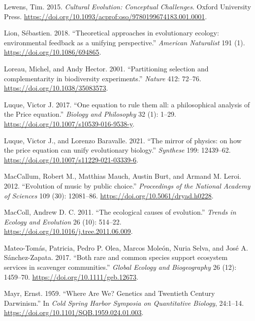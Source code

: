 \documentclass[
]{article}
\newlength{\cslhangindent}
\newlength{\cslentryspacingunit} %
\newenvironment{CSLReferences}[2] %
 {%
  \setlength{\parindent}{0pt}
  \ifodd #1
  \let\oldpar\par
  \def\par{\hangindent=\cslhangindent\oldpar}
  \fi
  \setlength{\parskip}{#2\cslentryspacingunit}
 }%
 {}
\begin{document}
\begin{CSLReferences}{1}{0}
\leavevmode{}%
Lewens, Tim. 2015. \emph{Cultural Evolution: Conceptual Challenges}.
Oxford University Press.
\url{https://doi.org/10.1093/acprof:oso/9780199674183.001.0001}.

\leavevmode{}%
Lion, Sébastien. 2018. {``{Theoretical approaches in evolutionary
ecology: environmental feedback as a unifying perspective}.''}
\emph{American Naturalist} 191 (1).
\url{https://doi.org/10.1086/694865}.

\leavevmode{}%
Loreau, Michel, and Andy Hector. 2001. {``{Partitioning selection and
complementarity in biodiversity experiments}.''} \emph{Nature} 412:
72--76. \url{https://doi.org/10.1038/35083573}.

\leavevmode{}%
Luque, Victor J. 2017. {``{One equation to rule them all: a
philosophical analysis of the Price equation}.''} \emph{Biology and
Philosophy} 32 (1): 1--29.
\url{https://doi.org/10.1007/s10539-016-9538-y}.

\leavevmode{}%
Luque, Victor J., and Lorenzo Baravalle. 2021. {``{The mirror of
physics: on how the price equation can unify evolutionary biology}.''}
\emph{Synthese} 199: 12439--62.
\url{https://doi.org/10.1007/s11229-021-03339-6}.

\leavevmode{}%
MacCallum, Robert M., Matthias Mauch, Austin Burt, and Armand M. Leroi.
2012. {``{Evolution of music by public choice}.''} \emph{Proceedings of
the National Academy of Sciences} 109 (30): 12081--86.
\url{https://doi.org/10.5061/dryad.h0228}.

\leavevmode{}%
MacColl, Andrew D. C. 2011. {``{The ecological causes of evolution}.''}
\emph{Trends in Ecology and Evolution} 26 (10): 514--22.
\url{https://doi.org/10.1016/j.tree.2011.06.009}.

\leavevmode{}%
Mateo-Tomás, Patricia, Pedro P. Olea, Marcos Moleón, Nuria Selva, and
José A. Sánchez-Zapata. 2017. {``{Both rare and common species support
ecosystem services in scavenger communities}.''} \emph{Global Ecology
and Biogeography} 26 (12): 1459--70.
\url{https://doi.org/10.1111/geb.12673}.

\leavevmode{}%
Mayr, Ernst. 1959. {``Where Are We? Genetics and Twentieth Century
Darwinism.''} In \emph{Cold Spring Harbor Symposia on Quantitative
Biology}, 24:1--14. \url{https://doi.org/10.1101/SQB.1959.024.01.003}.


\end{CSLReferences}
\end{document}
